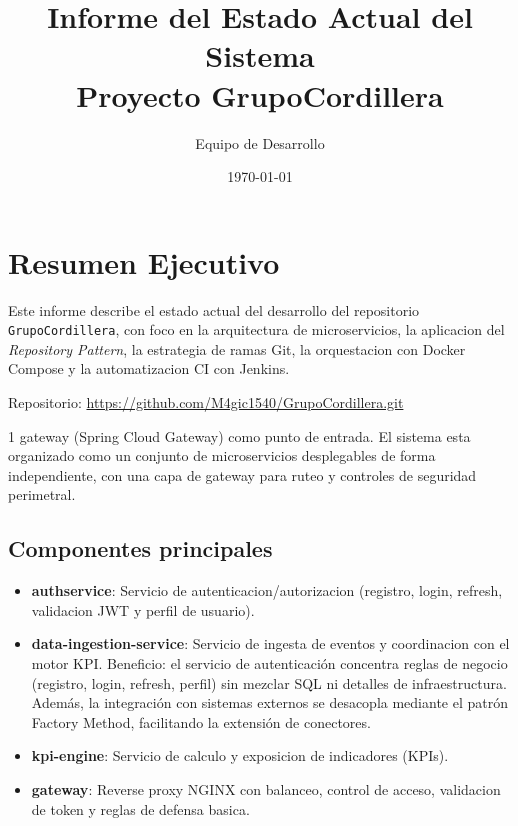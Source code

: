 \documentclass[12pt,a4paper]{article}
\title{Informe del Estado Actual del Sistema\\Proyecto GrupoCordillera}
\author{Equipo de Desarrollo}
\date{\today}
\begin{document}
\maketitle

\section{Resumen Ejecutivo}
Este informe describe el estado actual del desarrollo del repositorio \texttt{GrupoCordillera}, con foco en la arquitectura de microservicios, la aplicacion del \textit{Repository Pattern}, la estrategia de ramas Git, la orquestacion con Docker Compose y la automatizacion CI con Jenkins.

Repositorio: \url{https://github.com/M4gic1540/GrupoCordillera.git}

    \item 1 gateway (Spring Cloud Gateway) como punto de entrada.
El sistema esta organizado como un conjunto de microservicios desplegables de forma independiente, con una capa de gateway para ruteo y controles de seguridad perimetral.

\subsection{Componentes principales}
\begin{itemize}[leftmargin=*]
    \item \textbf{authservice}: Servicio de autenticacion/autorizacion (registro, login, refresh, validacion JWT y perfil de usuario).
    \item \textbf{data-ingestion-service}: Servicio de ingesta de eventos y coordinacion con el motor KPI.
Beneficio: el servicio de autenticación concentra reglas de negocio (registro, login, refresh, perfil) sin mezclar SQL ni detalles de infraestructura. Además, la integración con sistemas externos se desacopla mediante el patrón Factory Method, facilitando la extensión de conectores.
    \item \textbf{kpi-engine}: Servicio de calculo y exposicion de indicadores (KPIs).
    \item \textbf{gateway}: Reverse proxy NGINX con balanceo, control de acceso, validacion de token y reglas de defensa basica.
\end{itemize}
\end{document}
